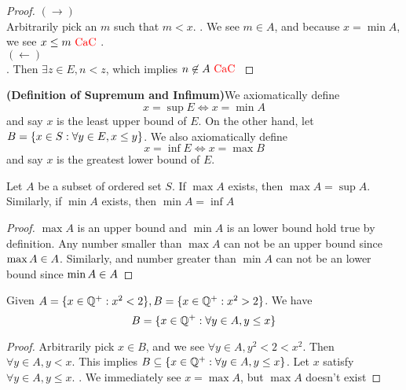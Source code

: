 \documentclass{report}
\begin{document}
\begin{proof}
$(\longrightarrow)$\\

Arbitrarily pick an $m$ such that $m<x$. . We see $m\in A$, and because $x=\min A$, we see $x\leq m\text{ \textcolor{red}{CaC} }$.\\

$(\longleftarrow)$\\

. Then $\exists z\in E, n<z$, which implies $n\not\in A\text{ \textcolor{red}{CaC} }$
\end{proof}
\begin{definition}
\textbf{(Definition of Supremum and Infimum)}We axiomatically define
\begin{equation}
x=\sup E\iff x=\min A
\end{equation}
and say $x$ is the least upper bound of $E$. On the other hand, let  $B=\{ x\in S:\forall y\in E, x\leq y \}$. We also axiomatically define
\begin{equation}
x=\inf E\iff x=\max B
\end{equation}
and say $x$ is the greatest lower bound of $E$.
\end{definition}
\begin{theorem}
Let $A$ be a subset of ordered set  $S$. If  $\max A$ exists, then $\max A=\sup A$. Similarly, if $\min A$ exists, then $\min A=\inf A$
\end{theorem}
\begin{proof}
$\max A$ is an upper bound and $\min  A$ is an lower bound hold true by definition. Any number smaller than $\max A$ can not be an upper bound since $\max A\in A$. Similarly, and number greater than $\min A$ can not be an lower bound since $\min A\in A$  
\end{proof}
\begin{theorem}
Given $A=\{ x\in\mathbb{Q}^+: x^2<2 \},B=\{ x\in\mathbb{Q}^+: x^2>2 \}$. We have
\begin{equation}
B=\{ x\in\mathbb{Q}^+ : \forall y\in A, y\leq x \}
\end{equation}
\end{theorem}
\begin{proof}
Arbitrarily pick $x\in B$, and we see $\forall y\in A, y^2<2<x^2$. Then $\forall y\in A,y<x$. This implies $B\subseteq \{ x\in\mathbb{Q}^+:\forall y\in A, y\leq x \}$. Let $x$ satisfy $\forall y\in A, y\leq x$. . We immediately see $x=\max A$, but $\max A$ doesn't exist \CaC
\end{proof}
\end{document}
